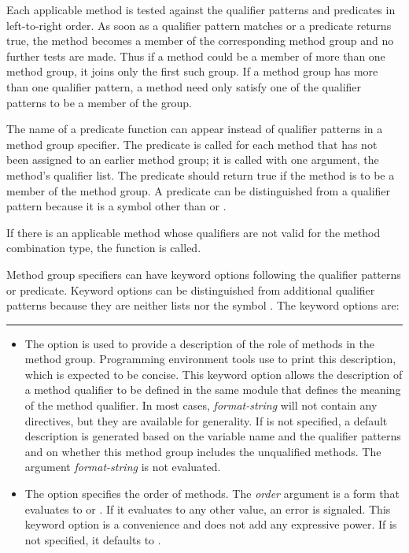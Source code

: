 \begin{defmac}
Each applicable method is tested against the qualifier patterns and
predicates in left-to-right order.  As soon as a qualifier pattern matches
or a predicate returns true, the method becomes a member of the
corresponding method group and no further tests are made.  Thus if a method
could be a member of more than one method group, it joins only the first
such group.  If a method group has more than one qualifier pattern, a
method need only satisfy one of the qualifier patterns to be a member of
the group.

The name of a predicate function can appear instead of qualifier
patterns in a method group specifier.  The predicate is called for
each method that has not been assigned to an earlier method group; it
is called with one argument, the method's qualifier list.  The
predicate should return true if the method is to be a member of the
method group.  A predicate can be distinguished from a qualifier pattern
because it is a symbol other than  or \cdf{*}.

If there is an applicable method whose qualifiers are not valid
for the method combination type, the function 
is called.

Method group specifiers can have keyword options following the
qualifier patterns or predicate.  Keyword options can be distinguished from
additional qualifier patterns because they are neither lists nor the symbol
\cdf{*}.  The keyword options are:
\hrule width 0pt\relax

\begin{itemize}

\item 
The  option is used to provide a description of the
role of methods in the method group.  Programming environment tools
use  to print this description, which
is expected to be concise.  This keyword
option allows the description of a method qualifier to be defined in
the same module that defines the meaning of the method
qualifier.  In most cases, \emph{format-string\/} will not contain any
 directives, but they are available for generality.  If 
 is not specified, a default description is generated
based on the variable name and the qualifier patterns and on whether
this method group includes the unqualified methods.  The argument {\it
format-string\/} is not evaluated.

\item 
The  option specifies the order of methods.  The {\it
order\/} argument is a form that evaluates to 
 or .  If it evaluates
to any other value, an error is signaled.  This keyword option is a
convenience and does not add any expressive power.
If  is not specified, it defaults to .


\end{itemize}
\end{defmac}
